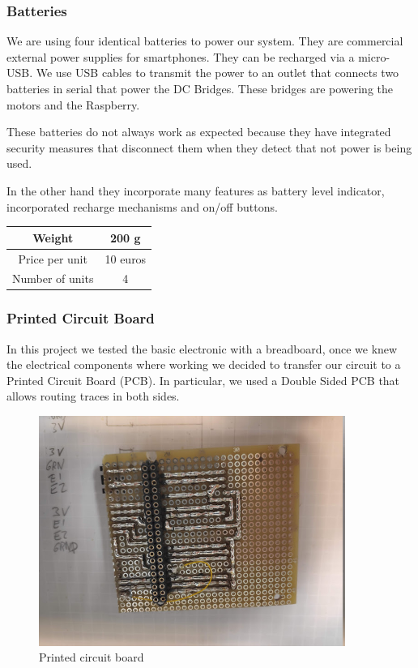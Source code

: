 \subsubsection{Batteries}
We are using four identical batteries to power our system. They are
commercial external power supplies for smartphones. They can be recharged
via a micro-USB. We use USB cables to transmit the power to an outlet
that connects two batteries in serial that power the DC Bridges.
These bridges are powering the motors and the Raspberry.

These batteries do not always work as expected because they have
integrated security measures that disconnect them when they detect
that not power is being used.

In the other hand they incorporate many features as battery level
indicator, incorporated recharge mechanisms and on/off buttons.
\begin{center}
    \begin{tabular}{ |c|c| }
        \hline
        Weight          & 200 g    \\
        \hline
        Price per unit  & 10 euros \\
        \hline
        Number of units & 4        \\
        \hline
    \end{tabular}
\end{center}
\subsubsection{Printed Circuit Board}
In this project we tested the basic electronic with a breadboard, once we knew
the electrical components where working we decided to transfer our circuit to
a Printed Circuit Board (PCB). In particular, we used a Double Sided PCB that
allows routing traces in both sides.
\begin{figure}[H]
    \centering
    \includegraphics[width=10cm]{img/components/PCB.jpg}
    \caption{Printed circuit board}
    \label{fig: PCB}
\end{figure}

